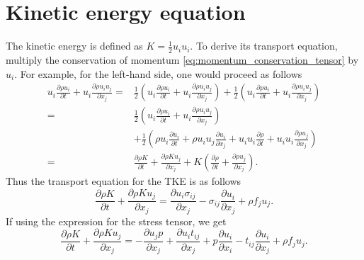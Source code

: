 \documentclass[oneside,a4paper,11pt]{report}
\begin{document}
\section{Kinetic energy equation}
The kinetic energy is defined as $K = \frac{1}{2} u_i u_i$. To derive its transport equation, multiply the conservation of momentum \cref{eq:momentum_conservation_tensor} by $u_i$. For example, for the left-hand side, one would proceed as follows
\begin{align}
u_i \frac{\partial \rho u_i}{\partial t} + u_i \frac{ \partial \rho u_i u_j}{\partial x_j} = &\frac{1}{2} \left ( u_i \frac{\partial \rho u_i}{\partial t} + u_i \frac{ \partial \rho u_i u_j}{\partial x_j} \right ) + \frac{1}{2} \left ( u_i \frac{\partial \rho u_i}{\partial t} + u_i \frac{ \partial \rho u_i u_j}{\partial x_j} \right ) \nonumber \\
= & \frac{1}{2} \left ( u_i \frac{\partial \rho u_i}{\partial t} + u_i \frac{ \partial \rho u_i u_j}{\partial x_j} \right ) \nonumber \\
& + \frac{1}{2} \left ( \rho u_i \frac{ \partial u_i}{\partial t} + \rho u_i u_j \frac{ \partial u_i}{\partial x_j} + u_i u_i \frac{\partial \rho}{\partial t} + u_i u_i \frac{\partial \rho u_j}{\partial x_j} \right ) \nonumber \\
= & \frac{\partial \rho K}{\partial t} + \frac{\partial \rho K u_j}{\partial x_j} + K \left ( \frac{\partial \rho}{\partial t} + \frac{\partial \rho u_j}{\partial x_j} \right ).
\end{align}
Thus the transport equation for the TKE is as follows 
\begin{equation}
    \label{eq:kinetic_energy_sigma}
    \frac{\partial \rho K}{\partial t} + \frac{\partial \rho K u_j}{\partial x_j} = \frac{\partial u_i \sigma_{ij}}{\partial x_j} - \sigma_{ij} \frac{\partial u_i}{\partial x_j} + \rho f_j u_j .
\end{equation}
If using the expression for the stress tensor, we get
\begin{equation}
    \label{eq:kinetic_energy}
    \frac{\partial \rho K}{\partial t} + \frac{\partial \rho K u_j}{\partial x_j} = - \frac{\partial u_j p}{\partial x_j} + \frac{\partial u_i t_{ij}}{\partial x_j} + p \frac{\partial u_i}{\partial x_i} - t_{ij} \frac{\partial u_i}{\partial x_j} + \rho f_j u_j .
\end{equation}

\end{document}
